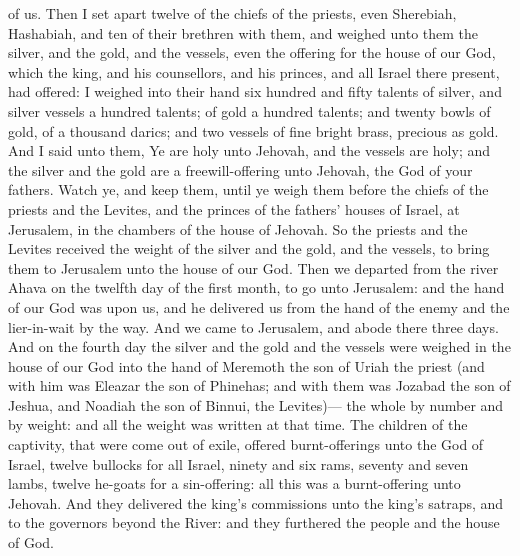 of us.  Then I set apart twelve of the chiefs of the priests, even Sherebiah, Hashabiah, and ten of their brethren with them, and weighed unto them the silver, and the gold, and the vessels, even the offering for the house of our God, which the king, and his counsellors, and his princes, and all Israel there present, had offered: I weighed into their hand six hundred and fifty talents of silver, and silver vessels a hundred talents; of gold a hundred talents; and twenty bowls of gold, of a thousand darics; and two vessels of fine bright brass, precious as gold. And I said unto them, Ye are holy unto Jehovah, and the vessels are holy; and the silver and the gold are a freewill-offering unto Jehovah, the God of your fathers. Watch ye, and keep them, until ye weigh them before the chiefs of the priests and the Levites, and the princes of the fathers’ houses of Israel, at Jerusalem, in the chambers of the house of Jehovah. So the priests and the Levites received the weight of the silver and the gold, and the vessels, to bring them to Jerusalem unto the house of our God.  Then we departed from the river Ahava on the twelfth day of the first month, to go unto Jerusalem: and the hand of our God was upon us, and he delivered us from the hand of the enemy and the lier-in-wait by the way. And we came to Jerusalem, and abode there three days. And on the fourth day the silver and the gold and the vessels were weighed in the house of our God into the hand of Meremoth the son of Uriah the priest (and with him was Eleazar the son of Phinehas; and with them was Jozabad the son of Jeshua, and Noadiah the son of Binnui, the Levites)— the whole by number and by weight: and all the weight was written at that time.  The children of the captivity, that were come out of exile, offered burnt-offerings unto the God of Israel, twelve bullocks for all Israel, ninety and six rams, seventy and seven lambs, twelve he-goats for a sin-offering: all this was a burnt-offering unto Jehovah. And they delivered the king’s commissions unto the king’s satraps, and to the governors beyond the River: and they furthered the people and the house of God. 

